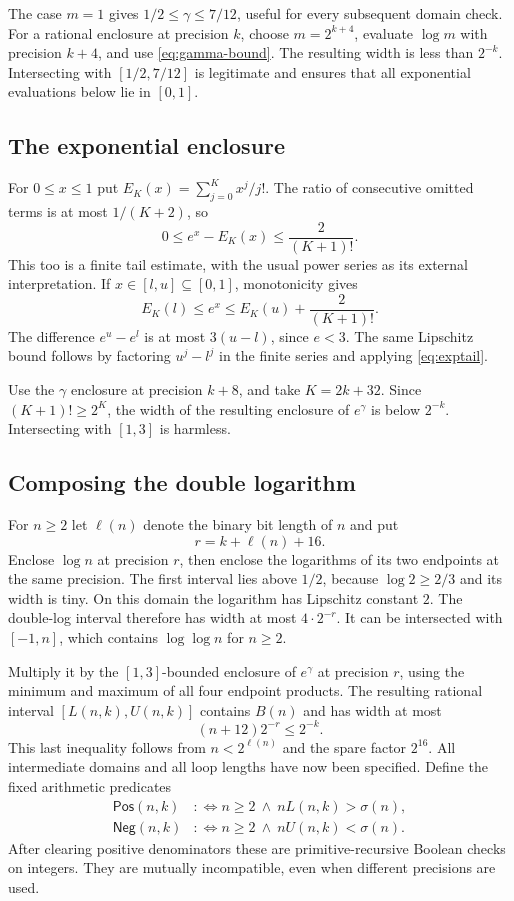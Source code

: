 \documentclass[11pt,a4paper]{article}
\theoremstyle{definition}
\newcommand{\Pos}{\mathsf{Pos}}
\newcommand{\Neg}{\mathsf{Neg}}
\begin{document}
The case $m=1$ gives $1/2\le\gamma\le7/12$, useful for every subsequent
domain check. For a rational enclosure at precision $k$, choose
$m=2^{k+4}$, evaluate $\log m$ with precision $k+4$, and use
\eqref{eq:gamma-bound}. The resulting width is less than $2^{-k}$.
Intersecting with $[1/2,7/12]$ is legitimate and ensures that all
exponential evaluations below lie in $[0,1]$.

\subsection{The exponential enclosure}

For $0\le x\le1$ put $E_K(x)=\sum_{j=0}^{K}x^j/j!$. The ratio of
consecutive omitted terms is at most $1/(K+2)$, so
\begin{equation}\label{eq:exptail}
 0\le e^x-E_K(x)\le\frac2{(K+1)!}.
\end{equation}
This too is a finite tail estimate, with the usual power series as its
external interpretation. If $x\in[l,u]\subseteq[0,1]$, monotonicity gives
\[
 E_K(l)\le e^x\le E_K(u)+\frac2{(K+1)!}.
\]
The difference $e^u-e^l$ is at most $3(u-l)$, since $e<3$.
The same Lipschitz bound follows by factoring $u^j-l^j$ in the finite
series and applying \eqref{eq:exptail}.

Use the $\gamma$ enclosure at precision $k+8$, and take $K=2k+32$.
Since $(K+1)!\ge2^K$, the width of the resulting enclosure of $e^\gamma$
is below $2^{-k}$. Intersecting with $[1,3]$ is harmless.

\subsection{Composing the double logarithm}

For $n\ge2$ let $\ell(n)$ denote the binary bit length of $n$ and put
\[
 r=k+\ell(n)+16.
\]
Enclose $\log n$ at precision $r$, then enclose the logarithms of its
two endpoints at the same precision. The first interval lies above
$1/2$, because $\log2\ge2/3$ and its width is tiny. On this domain
the logarithm has Lipschitz constant $2$. The double-log interval
therefore has width at most $4\cdot2^{-r}$. It can be intersected with
$[-1,n]$, which contains $\log\log n$ for $n\ge2$.

Multiply it by the $[1,3]$-bounded enclosure of $e^\gamma$ at precision
$r$, using the minimum and maximum of all four endpoint products.
The resulting rational interval $[L(n,k),U(n,k)]$ contains $B(n)$
and has width at most
\[
 (n+12)2^{-r}\le2^{-k}.
\]
This last inequality follows from $n<2^{\ell(n)}$ and the spare factor
$2^{16}$. All intermediate domains and all loop lengths have now been
specified. Define the fixed arithmetic predicates
\begin{align}
 \Pos(n,k)&:\Longleftrightarrow n\ge2\ \wedge\
                 nL(n,k)>\sigma(n),\label{eq:pos}\\
 \Neg(n,k)&:\Longleftrightarrow n\ge2\ \wedge\
                 nU(n,k)<\sigma(n).\label{eq:neg}
\end{align}
After clearing positive denominators these are primitive-recursive
Boolean checks on integers. They are mutually incompatible, even when
different precisions are used.
\end{document}
